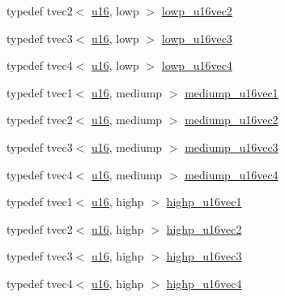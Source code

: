 \begin{DoxyCompactItemize}
\item 
typedef tvec2$<$ \hyperlink{group__gtc__type__precision_gae7a1571503f83d2264ddfa705a6b082a}{u16}, lowp $>$ \hyperlink{namespaceglm_a9924585d295ea61cf0effe9c5e42312f}{lowp\+\_\+u16vec2}
\item 
typedef tvec3$<$ \hyperlink{group__gtc__type__precision_gae7a1571503f83d2264ddfa705a6b082a}{u16}, lowp $>$ \hyperlink{namespaceglm_aa4c9f5644c12494b9c03591f73f687c8}{lowp\+\_\+u16vec3}
\item 
typedef tvec4$<$ \hyperlink{group__gtc__type__precision_gae7a1571503f83d2264ddfa705a6b082a}{u16}, lowp $>$ \hyperlink{namespaceglm_a503d858a175ae9b4c92008ec12bfb3eb}{lowp\+\_\+u16vec4}
\item 
typedef tvec1$<$ \hyperlink{group__gtc__type__precision_gae7a1571503f83d2264ddfa705a6b082a}{u16}, mediump $>$ \hyperlink{namespaceglm_a425c296693be47183ee5fb01eca35cef}{mediump\+\_\+u16vec1}
\item 
typedef tvec2$<$ \hyperlink{group__gtc__type__precision_gae7a1571503f83d2264ddfa705a6b082a}{u16}, mediump $>$ \hyperlink{namespaceglm_aa9f152631d100f6a7573e1fde5503591}{mediump\+\_\+u16vec2}
\item 
typedef tvec3$<$ \hyperlink{group__gtc__type__precision_gae7a1571503f83d2264ddfa705a6b082a}{u16}, mediump $>$ \hyperlink{namespaceglm_af9203271f50ffaf9c131e6e3230a13cf}{mediump\+\_\+u16vec3}
\item 
typedef tvec4$<$ \hyperlink{group__gtc__type__precision_gae7a1571503f83d2264ddfa705a6b082a}{u16}, mediump $>$ \hyperlink{namespaceglm_a3621e92947a8c0c4cfb4b07052bfda63}{mediump\+\_\+u16vec4}
\item 
typedef tvec1$<$ \hyperlink{group__gtc__type__precision_gae7a1571503f83d2264ddfa705a6b082a}{u16}, highp $>$ \hyperlink{namespaceglm_a7dc03cbaf98b6e427cc4d3c83d446c54}{highp\+\_\+u16vec1}
\item 
typedef tvec2$<$ \hyperlink{group__gtc__type__precision_gae7a1571503f83d2264ddfa705a6b082a}{u16}, highp $>$ \hyperlink{namespaceglm_a9c2e311542a1eec13b15e959036e0c34}{highp\+\_\+u16vec2}
\item 
typedef tvec3$<$ \hyperlink{group__gtc__type__precision_gae7a1571503f83d2264ddfa705a6b082a}{u16}, highp $>$ \hyperlink{namespaceglm_aba289b0588476cf2d90f11029c47461f}{highp\+\_\+u16vec3}
\item 
typedef tvec4$<$ \hyperlink{group__gtc__type__precision_gae7a1571503f83d2264ddfa705a6b082a}{u16}, highp $>$ \hyperlink{namespaceglm_a9d020e4972de8e94684c49f2587b1235}{highp\+\_\+u16vec4}
\item 

\end{DoxyCompactItemize}

